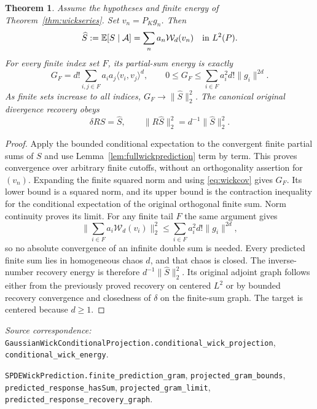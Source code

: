 \documentclass[11pt]{article}
\newtheorem{theorem}{Theorem}[section]
\newcommand{\code}[1]{{\small\nolinkurl{#1}}}
\begin{document}
\begin{theorem}\label{thm:projectedgram}
Assume the hypotheses and finite energy of
Theorem~\ref{thm:wickseries}. Set $v_n=P_Kg_n$. Then
\[
 \widehat S:=\mathbb E[S\mid\mathcal A]
       =\sum_n a_n\mathcal W_d(v_n)\quad\hbox{in }L^2(P).
\]
For every finite index set $F$, its partial-sum energy is exactly
\[
 G_F=d!\sum_{i,j\in F}a_i a_j\langle v_i,v_j\rangle^d,
 \qquad
 0\leq G_F\leq\sum_{i\in F}a_i^2d!\|g_i\|^{2d}.
\]
As finite sets increase to all indices, $G_F\to\|\widehat S\|_2^2$.
The canonical original divergence recovery obeys
\[
 \delta R\widehat S=\widehat S,\qquad
 \|R\widehat S\|_2^2=d^{-1}\|\widehat S\|_2^2.
\]
\end{theorem}
\begin{proof}
Apply the bounded conditional expectation to the convergent finite
partial sums of $S$ and use Lemma~\ref{lem:fullwickprediction} term
by term. This proves convergence over arbitrary finite cutoffs,
without an orthogonality assertion for $(v_n)$.
Expanding the finite squared norm and using \eqref{eq:wickcov}
gives $G_F$. Its lower bound is a squared norm, and its upper bound
is the contraction inequality for the conditional expectation of
the original orthogonal finite sum. Norm continuity proves its
limit. For any finite tail $F$ the same argument gives
\[
 \Big\|\sum_{i\in F}a_i\mathcal W_d(v_i)\Big\|_2^2
       \leq\sum_{i\in F}a_i^2d!\|g_i\|^{2d},
\]
so no absolute convergence of an infinite double sum is needed.
Every predicted finite sum lies in homogeneous chaos $d$, and that
chaos is closed. The inverse-number recovery energy is therefore
$d^{-1}\|\widehat S\|_2^2$. Its original adjoint graph follows
either from the previously proved recovery on centered $L^2$ or
by bounded recovery convergence and closedness of $\delta$ on the
finite-sum graph. The target is centered because $d\geq1$.
\end{proof}
\par\smallskip\begingroup\small\raggedright
\noindent\textit{Source correspondence:}
\code{GaussianWickConditionalProjection.conditional_wick_projection},
\code{conditional_wick_energy}.\par\noindent
\code{SPDEWickPrediction.finite_prediction_gram},
\code{projected_gram_bounds}, \code{predicted_response_hasSum},
\code{projected_gram_limit}, \code{predicted_response_recovery_graph}.
\par\endgroup
\end{document}
